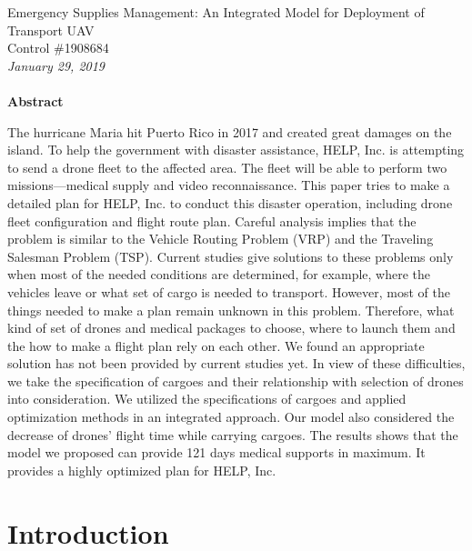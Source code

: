 \documentclass[12pt]{article}
\begin{document}
	
	\begin{titlepage}
		\begin{center}
			\Large{Emergency Supplies Management: An Integrated Model for Deployment of Transport UAV}\\
			\Large{Control \#1908684}\\
			\textit{January 29, 2019}\\
			~\\
			\textbf{Abstract} 
		\end{center}
		The hurricane Maria hit Puerto Rico in 2017 and created great damages on the island. To help the government with disaster assistance, HELP, Inc. is attempting to send a drone fleet to the affected area. The fleet will be able to perform two missions—medical supply and video reconnaissance. This paper tries to make a detailed plan for HELP, Inc. to conduct this disaster operation, including drone fleet configuration and flight route plan. Careful analysis implies that the problem is similar to the Vehicle Routing Problem (VRP) and the Traveling Salesman Problem (TSP). Current studies give solutions to these problems only when most of the needed conditions are determined, for example, where the vehicles leave or what set of cargo is needed to transport. However, most of the things needed to make a plan remain unknown in this problem. Therefore, what kind of set of drones and medical packages to choose, where to launch them and the how to make a flight plan rely on each other. We found an appropriate solution has not been provided by current studies yet. In view of these difficulties, we take the specification of cargoes and their relationship with selection of drones into consideration. We utilized the specifications of cargoes and applied optimization methods in an integrated approach. Our model also considered the decrease of drones' flight time while carrying cargoes. The results shows that the model we proposed can provide 121 days medical supports in maximum. It provides a highly optimized plan for HELP, Inc.
	\end{titlepage}
	
	\tableofcontents
	\newpage
	
	\section{Introduction}
	
\end{document}
